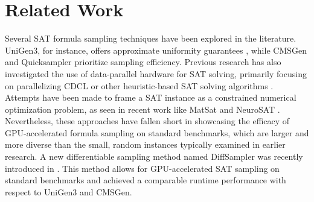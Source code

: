 \section{Related Work}
Several SAT formula sampling techniques have been explored in the literature. {\sc UniGen3}, for instance, offers approximate uniformity guarantees \cite{yash2022barbarik}, while {\sc CMSGen} and {\sc Quicksampler} \cite{dutra2018quicksampler} prioritize sampling efficiency. Previous research has also investigated the use of data-parallel hardware for SAT solving, primarily focusing on parallelizing CDCL or other heuristic-based SAT solving algorithms \cite{costa2013parallelization, osama2021sat}. Attempts have been made to frame a SAT instance as a constrained numerical optimization problem, as seen in recent work like {\sc MatSat} \cite{sato2021matsat} and {\sc NeuroSAT} \cite{amizadeh2018learning}. Nevertheless, these approaches have fallen short in showcasing the efficacy of GPU-accelerated formula sampling on standard benchmarks, which are larger and more diverse than the small, random instances typically examined in earlier research. A new differentiable sampling method named {\sc DiffSampler} was recently introduced in \cite{Ardakani2024diffsampler}. This method allows for GPU-accelerated SAT sampling on standard benchmarks and achieved a comparable runtime performance with respect to {\sc UniGen3} and {\sc CMSGen}.


